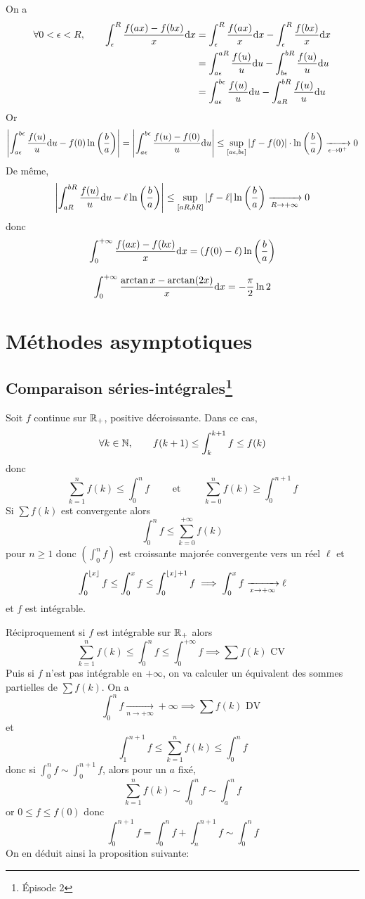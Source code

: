 On a \begin{align*}
    \forall 0<\epsilon<R,\qquad \int_\epsilon^R\frac{f(ax)-f(bx)}x\mathrm{d} x&=\int_\epsilon^R\frac{f(ax)}x\mathrm{d} x-\int_\epsilon^R\frac{f(bx)}x\mathrm{d} x\\
                                                                         &=\int_{a\epsilon}^{aR}\frac{f(u)}u\mathrm{d} u-\int_{b\epsilon}^{bR}\frac{f(u)}u\mathrm{d} u \\
                                                                         &= \int_{a\epsilon}^{b\epsilon}\frac{f(u)}u\mathrm{d} u-\int_{aR}^{bR}\frac{f(u)}u\mathrm{d} u
\end{align*}
Or \[
    \left| \int_{a\epsilon}^{b\epsilon}\frac{f(u)}u\mathrm{d} u-f(0)\ln\left(\frac ba\right) \right|= \left| \int_{a\epsilon}^{b\epsilon}\frac{f(u)-f(0)}u\mathrm{d} u \right|\leq \sup_{[a\epsilon, b\epsilon]}|f-f(0)|\cdot \ln\left(\frac ba\right)\xrightarrow[\epsilon\to0^+]{}0
\]
De même, \[
    \left| \int_{aR}^{bR}\frac{f(u)}u\mathrm{d} u -\ell\ln \left( \frac ba \right)\right|\leq \sup_{[aR, bR]}|f-\ell|\ln \left( \frac ba \right)\xrightarrow[R\to+\infty]{}0
\]
donc \[
    \int_0^{+\infty}\frac{f(ax)-f(bx)}x\mathrm{d} x=(f(0)-\ell)\ln \left( \frac ba \right)
\]
\begin{ex}
    \[
        \int_0^{+\infty}\frac{\arctan x-\arctan(2x)}x\mathrm{d} x=-\frac\pi2\ln2
    \]
\end{ex}

\section{Méthodes asymptotiques}

\subsection{Comparaison séries-intégrales\texorpdfstring{\footnote{Épisode 2}}{}}

Soit $f$ continue sur $\mathbb R_+$, positive décroissante. Dans ce cas, \[
    \forall k\in\mathbb N, \qquad f(k+1)\leq \int_k^{k+1}f\leq f(k)
\]
donc \[
    \sum_{k=1}^nf(k)\leq \int_0^nf\qquad \text{ et }\qquad \sum_{k=0}^nf(k)\geq \int_0^{n+1}f
\]
Si $\sum f(k)$ est convergente alors \[
    \int_0^nf\leq \sum_{k=0}^{+\infty}f(k)
\]
pour $n\geq 1$ donc $(\int_0^nf)$ est croissante majorée convergente vers un réel $\ell$ et \[
    \int_0^{\left\lfloor x\right\rfloor}f\leq \int_0^xf\leq \int_0^{\left\lfloor x\right\rfloor+1}f \implies \int_0^xf\xrightarrow[x\to+\infty]{}\ell
\]
et $f$ est intégrable.

Réciproquement si $f$ est intégrable sur $\mathbb R_+$ alors \[
    \sum_{k=1}^nf(k)\leq \int_0^nf\leq \int_0^{+\infty}f\implies \sum f(k)\text{ CV }
\]
Puis si $f$ n'est pas intégrable en $+\infty$, on va calculer un équivalent des sommes partielles de $\sum f(k)$. On a \[
    \int_0^nf\xrightarrow[n\to+\infty]{}+\infty\implies \sum f(k)\text{ DV }
\]
et \[
    \int_1^{n+1}f\leq \sum_{k=1}^nf(k)\leq \int_0^nf
\]
donc si $\displaystyle \int_0^nf\sim\int_0^{n+1}f$, alors pour un $a$ fixé, \[
    \sum_{k=1}^nf(k)\sim\int_0^nf\sim \int_a^nf
\]
or $0\leq f\leq f(0)$ donc \[
    \int_0^{n+1}f=\int_0^nf+\int_n^{n+1}f\sim\int_0^nf
\]
On en déduit ainsi la proposition suivante:

